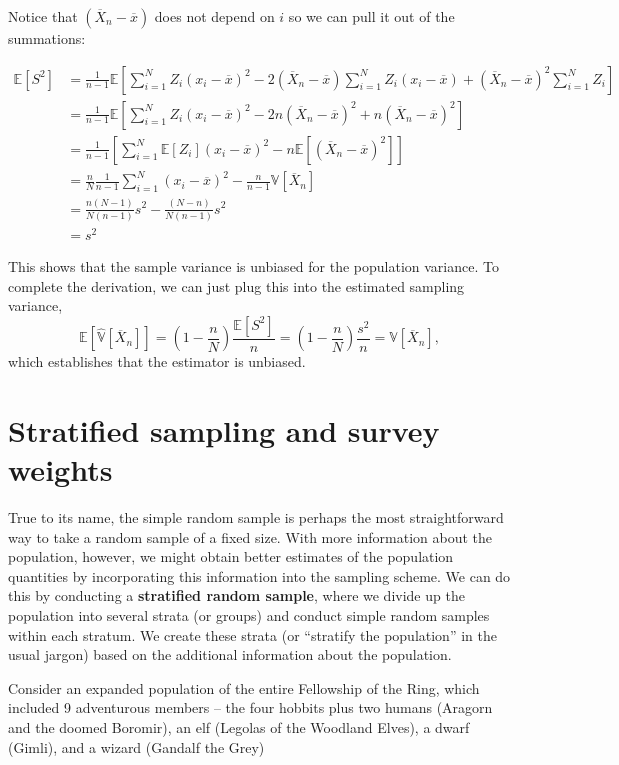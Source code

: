 \documentclass[
  13pt,
  letterpaper,
  DIV=11,
  numbers=noendperiod]{scrreprt}
\newcommand{\E}{\mathbb{E}}
\newcommand{\V}{\mathbb{V}}
\newcommand{\Xbar}{\overline{X}}
\theoremstyle{plain}
\theoremstyle{plain}
\theoremstyle{definition}
\theoremstyle{definition}
\theoremstyle{remark}
\begin{document}
Notice that \((\Xbar_n - \overline{x})\) does not depend on \(i\) so we
can pull it out of the summations:

\[
\begin{aligned}
\E[S^2] &= \frac{1}{n-1}  \E\left[\sum_{i=1}^N Z_i(x_i - \overline{x})^2 -2(\Xbar_n - \overline{x}) \sum_{i=1}^N Z_i(x_i - \overline{x}) + (\Xbar_n - \overline{x})^2 \sum_{i=1}^N Z_i\right] \\
 &= \frac{1}{n-1}  \E\left[\sum_{i=1}^N Z_i(x_i - \overline{x})^2 -2n(\Xbar_n - \overline{x})^2  + n(\Xbar_n - \overline{x})^2\right] \\
 &= \frac{1}{n-1}  \left[\sum_{i=1}^N \E[Z_i] (x_i - \overline{x})^2 -n\E[(\Xbar_n - \overline{x})^2]\right] \\
 &= \frac{n}{N}\frac{1}{n-1}\sum_{i=1}^N (x_i - \overline{x})^2 -\frac{n}{n-1}\V[\Xbar_n] \\
 &= \frac{n(N-1)}{N(n-1)}s^2 -\frac{(N-n)}{N(n-1)}s^2 \\
 &= s^2
\end{aligned}
\]

This shows that the sample variance is unbiased for the population
variance. To complete the derivation, we can just plug this into the
estimated sampling variance, \[
\E\left[\widehat{\V}[\Xbar_n]\right] = \left(1 - \frac{n}{N}\right)\frac{\E\left[S^2\right]}{n} = \left(1 - \frac{n}{N}\right)\frac{s^2}{n} = \V[\Xbar_n],
\] which establishes that the estimator is unbiased.

\section{Stratified sampling and survey
weights}\label{stratified-sampling-and-survey-weights}

True to its name, the simple random sample is perhaps the most
straightforward way to take a random sample of a fixed size. With more
information about the population, however, we might obtain better
estimates of the population quantities by incorporating this information
into the sampling scheme. We can do this by conducting a
\textbf{stratified random sample}, where we divide up the population
into several strata (or groups) and conduct simple random samples within
each stratum. We create these strata (or ``stratify the population'' in
the usual jargon) based on the additional information about the
population.

Consider an expanded population of the entire Fellowship of the Ring,
which included 9 adventurous members -- the four hobbits plus two humans
(Aragorn and the doomed Boromir), an elf (Legolas of the Woodland
Elves), a dwarf (Gimli), and a wizard (Gandalf the Grey)
\end{document}
